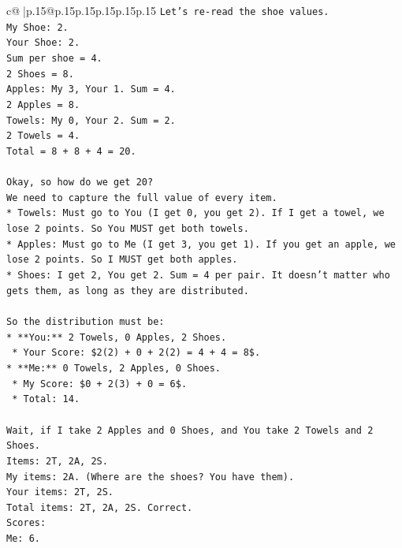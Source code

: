 \documentclass{article}
\begin{document}
{\begin{supertabular}{c@{$\;$}|p{.15\linewidth}@{}p{.15\linewidth}p{.15\linewidth}p{.15\linewidth}p{.15\linewidth}p{.15\linewidth}}
{{{\texttt{Let's re{-}read the shoe values.} \\
\texttt{My Shoe: 2.} \\
\texttt{Your Shoe: 2.} \\
\texttt{Sum per shoe = 4.} \\
\texttt{2 Shoes = 8.} \\
\texttt{Apples: My 3, Your 1. Sum = 4.} \\
\texttt{2 Apples = 8.} \\
\texttt{Towels: My 0, Your 2. Sum = 2.} \\
\texttt{2 Towels = 4.} \\
\texttt{Total = 8 + 8 + 4 = 20.} \\
\\ 
\texttt{Okay, so how do we get 20?} \\
\texttt{We need to capture the full value of every item.} \\
\texttt{*   Towels: Must go to You (I get 0, you get 2). If I get a towel, we lose 2 points. So You MUST get both towels.} \\
\texttt{*   Apples: Must go to Me (I get 3, you get 1). If you get an apple, we lose 2 points. So I MUST get both apples.} \\
\texttt{*   Shoes: I get 2, You get 2. Sum = 4 per pair. It doesn't matter who gets them, as long as they are distributed.} \\
\\ 
\texttt{So the distribution must be:} \\
\texttt{*   **You:** 2 Towels, 0 Apples, 2 Shoes.} \\
\texttt{    *   Your Score: \$2(2) + 0 + 2(2) = 4 + 4 = 8\$.} \\
\texttt{*   **Me:** 0 Towels, 2 Apples, 0 Shoes.} \\
\texttt{    *   My Score: \$0 + 2(3) + 0 = 6\$.} \\
\texttt{    *   Total: 14.} \\
\\ 
\texttt{Wait, if I take 2 Apples and 0 Shoes, and You take 2 Towels and 2 Shoes.} \\
\texttt{Items: 2T, 2A, 2S.} \\
\texttt{My items: 2A. (Where are the shoes? You have them).} \\
\texttt{Your items: 2T, 2S.} \\
\texttt{Total items: 2T, 2A, 2S. Correct.} \\
\texttt{Scores:} \\
\texttt{Me: 6.} \\
}}}
\end{supertabular}}
\end{document}
